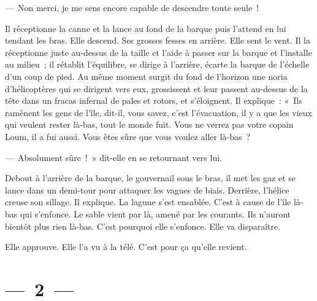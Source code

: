 \documentclass[twoside]{book} %
\begin{document}
— Non merci, je me sens encore capable de descendre toute seule !\par
Il réceptionne la canne et la lance au fond de la barque puis l’attend en lui tendant les bras. Elle descend. Ses grosses fesses en arrière. Elle sent le vent. Il la réceptionne juste au-dessus de la taille et l’aide à passer sur la barque et l’installe au milieu ; il rétablit l’équilibre, se dirige à l’arrière, écarte la barque de l’échelle d’un coup de pied. Au même moment surgit du fond de l’horizon une noria d’hélicoptères qui se dirigent vers eux, grossissent et leur passent au-dessus de la tête dans un fracas infernal de pales et rotors, et s’éloignent. Il explique : « Ils ramènent les gens de l’île, dit-il, vous savez, c’est l’évacuation, il y a que les vieux qui veulent rester là-bas, tout le monde fuit. Vous ne verrez pas votre copain Loum, il a fui aussi. Vous êtes sûre que vous voulez aller là-bas ?\par
— Absolument sûre ! » dit-elle en se retournant vers lui.\par
Debout à l’arrière de la barque, le gouvernail sous le bras, il met les gaz et se lance dans un demi-tour pour attaquer les vagues de biais. Derrière, l’hélice creuse son sillage. Il explique. La lagune s’est ensablée. C’est à cause de l’île là-bas qui s’enfonce. Le sable vient par là, amené par les courants. Ils n’auront bientôt plus rien là-bas. C’est pourquoi elle s’enfonce. Elle va disparaître.\par
Elle approuve. Elle l’a vu à la télé. C’est pour ça qu’elle revient.

\section[{— 2 —}]{— 2 —}
\renewcommand{\leftmark}{— 2 —}
\end{document}
